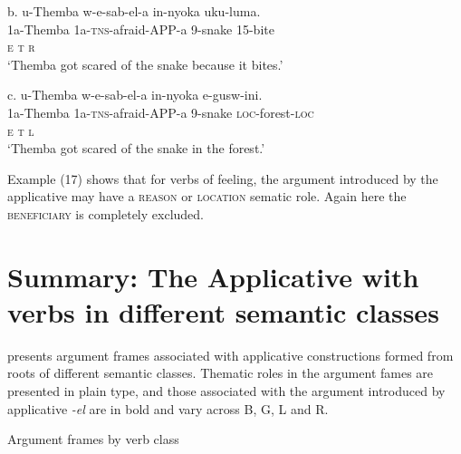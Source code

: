 \gll   b.  u-Themba      w-e-sab-el-a      in-nyoka    uku-luma. \\
         1a-Themba      1a-\textsc{tns}{}-afraid-APP-a  9-snake  15-bite\\
         \textsc{e                    t          r}\\
\glt     ‘Themba got scared of the snake because it bites.’
\z

\gll   c.  u-Themba      w-e-sab-el-a      in-nyoka    e-gusw-ini. \\
         1a-Themba      1a-\textsc{tns}{}-afraid-APP-a  9-snake  \textsc{loc}{}-forest-\textsc{loc}\\
         \textsc{e                    t               l}\\
\glt     ‘Themba got scared of the snake in the forest.’
\z

Example (17) shows that for verbs of feeling, the argument introduced by the applicative may have a \textsc{reason} or \textsc{location} sematic role. Again here the \textsc{beneficiary} is completely excluded. 

\section{Summary: The Applicative with verbs in different semantic classes}

 presents argument frames associated with applicative constructions formed from roots of different semantic classes. Thematic roles in the argument fames are presented in plain type, and those associated with the argument introduced by applicative \textit{{}-el} are in bold and vary across B, G, L and R. 

\begin{stylelsTableHeading}%
\begin{table}
\caption{Argument frames by verb class}
\label{tab:2}
\end{table}\end{stylelsTableHeading}

